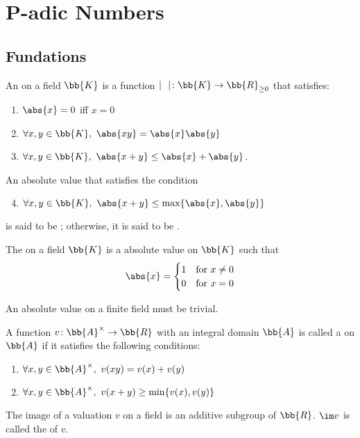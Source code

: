 \section{P-adic Numbers\cite{gouvea}}
\subsection{Fundations}
An  on a field $\bb{K}$ is a function $\mid \ \ \mid \colon \bb{K} \to \bb{R}_{\ge0}$ that satisfies:
\begin{enumerate}
\item $\abs{x} = 0$ iff $x = 0$
\item $\forall x, y \in \bb{K},\ \abs{xy} = \abs{x}\abs{y}$
\item $\forall x, y \in \bb{K},\ \abs{x+y} \le \abs{x}+\abs{y}$.
\end{enumerate}

An absolute value that satisfies the condition
\begin{enumerate}
\setcounter{enumi}{3}
\item $\forall x, y \in \bb{K},\ \abs{x+y} \le \max \{ \abs{x},\abs{y} \}$
\end{enumerate}
is said to be ; otherwise, it is said to be .

The  on a field $\bb{K}$ is a absolute value on $\bb{K}$ such that
\[
\abs{x} = \begin{cases}
 1 & \text{for}\ x \neq 0 \\
 0 & \text{for}\ x = 0
 \end{cases}
\]

An absolute value on a finite field must be trivial.

A function $v \colon \bb{A}^\times \to \bb{R}$ with an integral domain $\bb{A}$ is called a  on $\bb{A}$ if it satisfies the following conditions:
\begin{enumerate}
\item $\forall x, y \in \bb{A}^\times,\ v(xy) = v(x) + v(y)$
\item $\forall x, y \in \bb{A}^\times,\ v(x+y) \ge \min \{ v(x), v(y) \}$
\end{enumerate}

The image of a valuation $v$ on a field is an additive subgroup of $\bb{R}$. $\im v$ is called the  of $v$.

